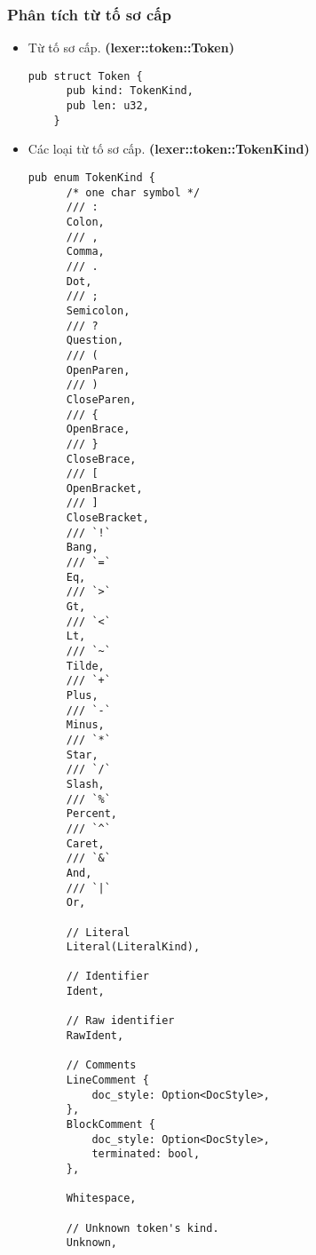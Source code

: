 {\subsubsection{Phân tích từ tố sơ cấp}
\begin{itemize}
  \item \label{ap1:simple_token}Từ tố sơ cấp. \textbf{(lexer::token::Token)}
  \begin{lstlisting}[]
    pub struct Token {
      pub kind: TokenKind,
      pub len: u32,
    }
  \end{lstlisting}
  \item Các loại từ tố sơ cấp. \textbf{(lexer::token::TokenKind)}
  \begin{lstlisting}[]
    pub enum TokenKind {
      /* one char symbol */
      /// :
      Colon,
      /// ,
      Comma,
      /// .
      Dot,
      /// ;
      Semicolon,
      /// ?
      Question,
      /// (
      OpenParen,
      /// )
      CloseParen,
      /// {
      OpenBrace,
      /// }
      CloseBrace,
      /// [
      OpenBracket,
      /// ]
      CloseBracket,
      /// `!`
      Bang,
      /// `=`
      Eq,
      /// `>`
      Gt,
      /// `<`
      Lt,
      /// `~`
      Tilde,
      /// `+`
      Plus,
      /// `-`
      Minus,
      /// `*`
      Star,
      /// `/`
      Slash,
      /// `%`
      Percent,
      /// `^`
      Caret,
      /// `&`
      And,
      /// `|`
      Or,

      // Literal
      Literal(LiteralKind),

      // Identifier
      Ident,

      // Raw identifier
      RawIdent,

      // Comments
      LineComment {
          doc_style: Option<DocStyle>,
      },
      BlockComment {
          doc_style: Option<DocStyle>,
          terminated: bool,
      },

      Whitespace,

      // Unknown token's kind.
      Unknown,


\end{lstlisting}
\end{itemize}}
